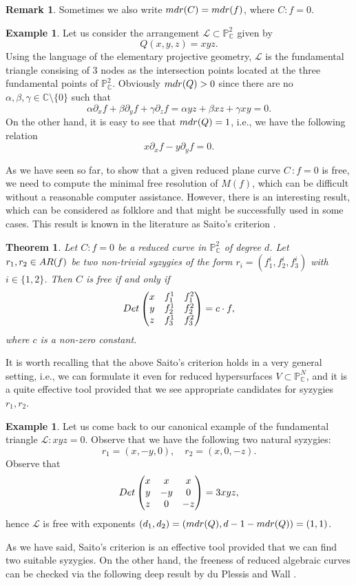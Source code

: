 \documentclass[12pt]{article}
\theoremstyle{plain}
\newtheorem{theorem}[thm]{Theorem}
\theoremstyle{definition}
\newtheorem{remark}[thm]{Remark}
\newtheorem{example}[thm]{Example}
\begin{document}
\begin{remark}
Sometimes we also write ${\rm mdr}(C) = {\rm mdr}(f)$, where $C : f=0$.
\end{remark}
\begin{example}
Let us consider the arrangement $\mathcal{L} \subset \mathbb{P}^{2}_{\mathbb{C}}$ given by 
$$Q(x,y,z)=xyz.$$
Using the language of the elementary projective geometry, $\mathcal{L}$ is the fundamental triangle consising of $3$ nodes as the intersection points located at the three fundamental points of $\mathbb{P}^{2}_{\mathbb{C}}$. 
Obviously ${\rm mdr}(Q)>0$ since there are no $\alpha,\beta,\gamma \in \mathbb{C}\setminus \{0\}$ such that
$$\alpha \partial_{x}f + \beta\partial_{y} f + \gamma\partial_{z}f = \alpha yz + \beta xz + \gamma xy = 0.$$
On the other hand, it is easy to see that ${\rm mdr}(Q)=1$, i.e., we have the following relation
$$x \partial_{x}f - y\partial_{y} f = 0.$$
\end{example}
As we have seen so far, to show that a given reduced plane curve $C \, : f=0$ is free, we need to compute the minimal free resolution of $M(f)$, which can be difficult without a reasonable computer assistance. However, there is an interesting result, which can be considered as folklore and that might be successfully used in some cases. This result is known in the literature as Saito's criterion \cite[Theorem 8.1]{Dimca}.
\begin{theorem}
Let $C : f=0$ be a reduced curve in $\mathbb{P}^{2}_{\mathbb{C}}$ of degree $d$. Let  $r_{1},r_{2} \in {\rm AR}(f)$ be two non-trivial syzygies of the form
$r_{i} = (f_{1}^{i},f_{2}^{i},f_{3}^{i})$ with $i \in \{1,2\}$. Then
$C$ is free if and only if
$${\rm Det}\begin{pmatrix}
x & f_{1}^{1} & f_{1}^{2} \\
y & f_{2}^{1} & f_{2}^{2} \\
z & f_{3}^{1} & f_{3}^{2}
\end{pmatrix} = c \cdot f,$$
where $c$ is a non-zero constant.
\end{theorem}
It is worth recalling that the above Saito's criterion holds in a very general setting, i.e., we can formulate it even for reduced hypersurfaces $V \subset \mathbb{P}^{N}_{\mathbb{C}}$, and it is a quite effective tool provided that we see appropriate candidates for syzygies $r_{1}, r_{2}$.
\begin{example}
Let us come back to our canonical example of the fundamental triangle $\mathcal{L} : xyz=0$. Observe that we have the following two natural syzygies:
$$r_{1} = (x,-y,0), \quad r_{2} = (x,0,-z).$$
Observe that
$${\rm Det}\begin{pmatrix}
x & x & x \\
y & -y & 0 \\
z & 0 & -z
\end{pmatrix} = 3xyz,$$
hence $\mathcal{L}$ is free with exponents $(d_{1},d_{2})=({\rm mdr}(Q),d-1-{\rm mdr}(Q)) = (1,1)$.
\end{example}
As we have said, Saito's criterion is an effective tool provided that we can find two suitable syzygies. On the other hand, the freeness of reduced algebraic curves can be checked via the following deep result by du Plessis and Wall \cite{duP}.
\end{document}
